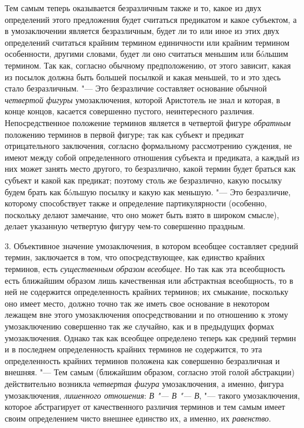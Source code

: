 Тем самым теперь оказывается безразличным также и то, какое из
двух определений этого предложения будет считаться предикатом и какое
субъектом, а в умозаключении является безразличным, будет ли то или иное из
этих двух определений считаться крайним термином единичности или крайним
термином особенности, другими словами, будет ли оно считаться меньшим или
бóльшим термином. Так как, согласно обычному предположению, от этого
зависит, какая из посылок должна быть большей посылкой и какая меньшей, то
и это здесь стало безразличным. "--- Это безразличие составляет
основание обычной {\em четвертой фигуры} умозаключения,
которой Аристотель не знал и которая,
в конце концов, касается совершенно пустого, неинтересного различия.
Непосредственное положение терминов является в четвертой фигуре
{\em обратным} положению
терминов в первой фигуре; так как субъект и предикат отрицательного
заключения, согласно формальному рассмотрению суждения, не имеют между
собой определенного отношения субъекта и предиката, а каждый из них может
занять место другого, то безразлично, какой термин будет браться как
субъект и какой как предикат; поэтому столь же безразлично, какую посылку
будем брать как бóльшую посылку и какую как меньшую. "---
Это безразличие, которому способствует также и определение
партикулярности (особенно, поскольку делают замечание, что оно может быть
взято в широком смысле), делает указанную четвертую фигуру чем-то
совершенно праздным.

3. Объективное значение умозаключения, в котором всеобщее
составляет средний термин, заключается в том, что опосредствующее, как
единство крайних терминов, есть
{\em существенным образом всеобщее}.
Но так как эта всеобщность есть ближайшим образом лишь
качественная или абстрактная всеобщность, то в ней не содержится
определенность крайних терминов; их смыкание, поскольку оно имеет место,
должно точно так же иметь свое основание в некотором лежащем вне этого
умозаключения опосредствовании и по отношению к этому умозаключению
совершенно так же случайно, как и в предыдущих формах умозаключения. Однако
так как всеобщее определено теперь как средний термин и в последнем
определенность крайних терминов не содержится, то эта определенность
крайних терминов положена как совершенно безразличная и внешняя. "---
Тем самым (ближайшим образом, согласно этой голой
абстракции) действительно возникла
{\em четвертая фигура}
умозаключения, а именно, фигура умозаключения,
{\em лишенного отношения}:
{\em В "--- В
"--- В}, "--- такого умозаключения, которое
абстрагирует от качественного различия терминов и тем самым имеет своим
определением чисто внешнее единство их, а именно, их
{\em равенство}.

